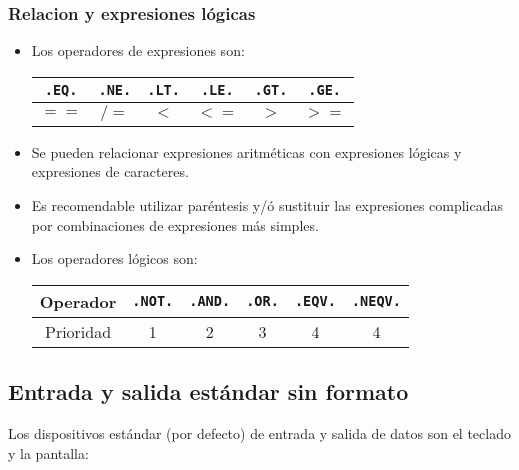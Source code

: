 \subsubsection{Relacion y expresiones lógicas}

\begin{itemize}
	\item Los operadores de expresiones son:
	      \begin{table}[h!] \centering
		      \begin{tabular}{|c|c|c|c|c|c|}
			      \hline
			      {\tt .EQ.} & {\tt .NE.} & {\tt .LT.} & {\tt .LE.} & {\tt .GT.} & {\tt .GE.} \\ \hline
			      $==$       & $/=$       & $<$        & $<=$       & $>$        & $>=$       \\    \hline
		      \end{tabular}
	      \end{table}

	\item Se pueden relacionar expresiones aritméticas con expresiones lógicas y expresiones de caracteres.
	\item Es recomendable utilizar paréntesis y/ó sustituir las expresiones complicadas por combinaciones de expresiones más simples.
	\item Los operadores lógicos son:
	      \begin{table}[h!] \centering
		      \begin{tabular}{|c|c|c|c|c|c|}
			      \hline  Operador & {\tt .NOT.} & {\tt .AND.} & {\tt .OR.} & {\tt .EQV.} & {\tt .NEQV.} \\ \hline Prioridad
			                       & 1           & 2           & 3          & 4           & 4            \\    \hline
		      \end{tabular}
	      \end{table}
\end{itemize}

\subsection{Entrada y salida estándar sin formato}


Los dispositivos estándar (por defecto) de entrada y salida de datos son el teclado y la pantalla:

